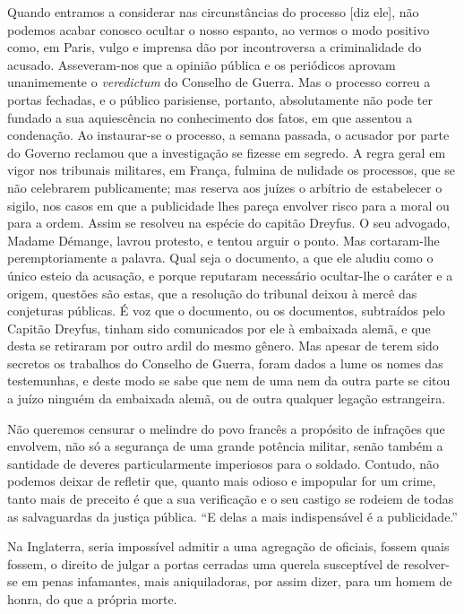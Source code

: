 \begin{hedraquote}
Quando entramos a considerar nas circunstâncias do processo [diz ele],
não podemos acabar conosco ocultar o nosso espanto, ao vermos o modo
positivo como, em Paris, vulgo e imprensa dão por incontroversa a
criminalidade do acusado. Asseveram-nos que a opinião pública e os
periódicos aprovam unanimemente o \textit{veredictum} do Conselho de Guerra. Mas
o processo correu a portas fechadas, e o público parisiense, portanto,
absolutamente não pode ter fundado a sua aquiescência no conhecimento
dos fatos, em que assentou a condenação. Ao instaurar-se o processo,
a semana passada, o acusador por parte do Governo reclamou que a
investigação se fizesse em segredo. A regra geral em vigor nos
tribunais militares, em França, fulmina de nulidade os processos, que
se não celebrarem publicamente; mas reserva aos juízes o arbítrio de
estabelecer o sigilo, nos casos em que a publicidade lhes pareça
envolver risco para a moral ou para a ordem. Assim se resolveu na
espécie do capitão Dreyfus. O seu advogado, Madame Démange, lavrou
protesto, e tentou arguir o ponto. Mas cortaram-lhe peremptoriamente
a palavra. Qual seja o documento, a que ele aludiu como o único esteio
da acusação, e porque reputaram necessário ocultar-lhe o caráter e a
origem, questões são estas, que a resolução do tribunal deixou à mercê
das conjeturas públicas. É voz que o documento, ou os documentos,
subtraídos pelo Capitão Dreyfus, tinham sido comunicados por ele à
embaixada alemã, e que desta se retiraram por outro ardil do mesmo
gênero. Mas apesar de terem sido secretos os trabalhos do Conselho de
Guerra, foram dados a lume os nomes das testemunhas, e deste modo se
sabe que nem de uma nem da outra parte se citou a juízo ninguém da
embaixada alemã, ou de outra qualquer legação estrangeira.

Não queremos censurar o melindre do povo francês a propósito de
infrações que envolvem, não só a segurança de uma grande potência
militar, senão também a santidade de deveres particularmente imperiosos
para o soldado. Contudo, não podemos deixar de refletir que, quanto
mais odioso e impopular for um crime, tanto mais de preceito é que a
sua verificação e o seu castigo se rodeiem de todas as salvaguardas da
justiça pública. ``E delas a mais indispensável é a
publicidade.''

Na Inglaterra, seria impossível admitir a uma agregação de oficiais,
fossem quais fossem, o direito de julgar a portas cerradas uma querela
susceptível de resolver-se em penas infamantes, mais aniquiladoras,
por assim dizer, para um homem de honra, do que a própria morte.


\end{hedraquote}
